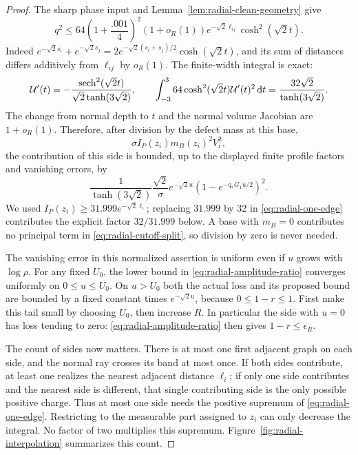 \begin{proof}
The sharp phase input and Lemma~\ref{lem:radial-clean-geometry} give
\begin{equation}\label{eq:radial-q-band}
 q^2\le64\left(1+\frac{.001}{4}\right)^2(1+o_R(1))
       e^{-\sqrt2\ell_{ij}}\cosh^2(\sqrt2t).
\end{equation}
Indeed $e^{-\sqrt2s_i}+e^{-\sqrt2s_j}
=2e^{-\sqrt2(s_i+s_j)/2}\cosh(\sqrt2t)$, and its sum of distances differs additively from $\ell_{ij}$ by $o_R(1)$.
The finite-width integral is exact:
\begin{equation}\label{eq:radial-finite-integral}
 \mathcal U'(t)=-\frac{\operatorname{sech}^2(\sqrt2t)}{\sqrt2\tanh(3\sqrt2)},
 \qquad
 \int_{-3}^{3}64\cosh^2(\sqrt2t)\mathcal U'(t)^2\,\mathrm d t
 =\frac{32\sqrt2}{\tanh(3\sqrt2)}.
\end{equation}
The change from normal depth to $t$ and the normal volume Jacobian are $1+o_R(1)$. Therefore, after division by the defect mass at this base,
\[
 \sigma I_P(z_i)m_B(z_i)^2V_i^2,
\]
the contribution of this side is bounded, up to the displayed finite profile factors and vanishing errors, by
\begin{equation}\label{eq:radial-one-edge}
 \frac{1}{\tanh(3\sqrt2)}\frac{\sqrt2}{\sigma}
 e^{-\sqrt2u}(1-e^{-q_*G_1u/2})^2.
\end{equation}
We used $I_P(z_i)\ge31.999e^{-\sqrt2\ell_i}$; replacing $31.999$ by $32$ in \eqref{eq:radial-one-edge} contributes the explicit factor $32/31.999$ below. A base with $m_B=0$ contributes no principal term in \eqref{eq:radial-cutoff-split}, so division by zero is never needed.

The vanishing error in this normalized assertion is uniform even if $u$ grows with $\log\rho$. For any fixed $U_0$, the lower bound in \eqref{eq:radial-amplitude-ratio} converges uniformly on $0\le u\le U_0$. On $u>U_0$ both the actual loss and its proposed bound are bounded by a fixed constant times $e^{-\sqrt2u}$, because $0\le1-r\le1$. First make this tail small by choosing $U_0$, then increase $R$. In particular the side with $u=0$ has loss tending to zero: \eqref{eq:radial-amplitude-ratio} then gives $1-r\le\epsilon_R$.

The count of sides now matters. There is at most one first adjacent graph on each side, and the normal ray crosses its band at most once. If both sides contribute, at least one realizes the nearest adjacent distance $\ell_i$; if only one side contributes and the nearest side is different, that single contributing side is the only possible positive charge. Thus at most one side needs the positive supremum of \eqref{eq:radial-one-edge}. Restricting to the measurable part assigned to $z_i$ can only decrease the integral. No factor of two multiplies this supremum. Figure~\ref{fig:radial-interpolation} summarizes this count.


\end{proof}

